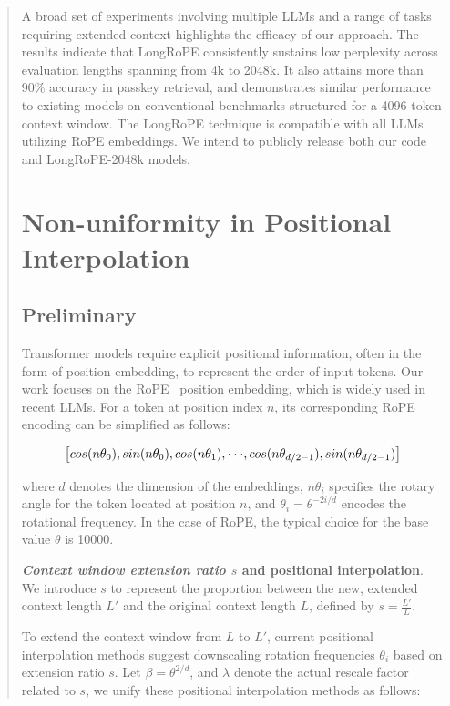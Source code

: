 \begin{abstract}
A broad set of experiments involving multiple LLMs and a range of tasks requiring extended context highlights the efficacy of our approach. The results indicate that LongRoPE consistently sustains low perplexity across evaluation lengths spanning from 4k to 2048k. It also attains more than 90\% accuracy in passkey retrieval, and demonstrates similar performance to existing models on conventional benchmarks structured for a 4096-token context window. The LongRoPE technique is compatible with all LLMs utilizing RoPE embeddings. We intend to publicly release both our code and LongRoPE-2048k models.

\section{Non-uniformity in Positional Interpolation}
\label{sec:analysis}

\subsection{Preliminary}

Transformer models require explicit positional information, often in the form of position embedding, to represent the order of input tokens. Our work focuses on the RoPE~\cite{rope} position embedding, which is widely used in recent  LLMs. For a token at position index $n$, its corresponding RoPE encoding can be simplified as follows:

\begin{equation}
		\fontsize{7.8}{7.8} \selectfont
	\label{eq:rope}
	\left[ cos(n\theta_0), sin(n\theta_0), cos(n\theta_1), \cdot\cdot\cdot, cos(n\theta_{d/2-1}), sin(n\theta_{d/2-1}) \right]   
\end{equation}

where $d$ denotes the dimension of the embeddings, 
 $n\theta_i$ specifies the rotary angle for the token located at position $n$, 
and $\theta_i=\theta^{-2i/d}$ encodes the rotational frequency. In the case of RoPE, the typical choice for the base value $\theta$ is 10000.

\textbf{\emph{Context window extension ratio $s$} and positional interpolation}. We introduce $s$ to represent the proportion between the new, extended context length $L'$ and the original context length $L$, defined by $s=\frac{L'}{L}$.

To extend the context window from $L$ to $L'$, current positional interpolation methods suggest downscaling rotation frequencies $\theta_i$ based on extension ratio $s$. Let $\beta=\theta^{2/d}$, and $\lambda$ denote the actual rescale factor related to $s$, we   unify these positional interpolation methods as follows:


\end{abstract}
